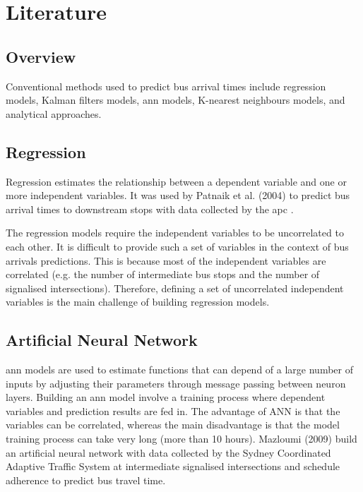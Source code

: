 \chapter{Literature}

\section{Overview}
\par Conventional methods used to predict bus arrival times include regression models, Kalman filters models, \acrfull{ann} models, K-nearest neighbours models, and analytical approaches.

\section{Regression}
\par Regression estimates the relationship between a dependent variable and one or more independent variables. It was used by Patnaik et al. (2004) to predict bus arrival times to downstream stops with data collected by the \acrfull{apc} \cite{regression_models}.

\par The regression models require the independent variables to be uncorrelated to each other. It is difficult to provide such a set of variables in the context of bus arrivals predictions. This is because most of the independent variables are correlated (e.g. the number of intermediate bus stops and the number of signalised intersections). Therefore, defining a set of uncorrelated independent variables is the main challenge of building regression models.

\section{Artificial Neural Network}
\par \acrshort{ann} models are used to estimate functions that can depend of a large number of inputs by adjusting their parameters through message passing between neuron layers. Building an \acrshort{ann} model involve a training process where dependent variables and prediction results are fed in. The advantage of ANN is that the variables can be correlated, whereas the main disadvantage is that the model training process can take very long (more than 10 hours). Mazloumi (2009) build an artificial neural network with data collected by the Sydney Coordinated Adaptive Traffic System at intermediate signalised intersections and schedule adherence to predict bus travel time\cite{ann}.

